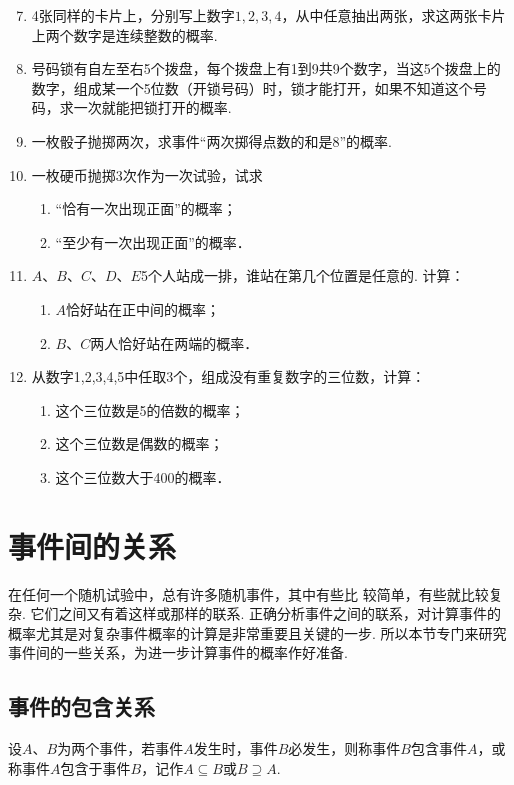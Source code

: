 \begin{enumerate}\setcounter{enumi}{6}
    \item 4张同样的卡片上，分别写上数字$1,2,3,4$，从中任意抽出两张，求这两张卡片上两个数字是连续整数的概率.
    \item 号码锁有自左至右5个拨盘，每个拨盘上有1到9共9个数字，当这5个拨盘上的数字，组成某一个5位数（开锁号码）时，锁才能打开，如果不知道这个号码，求一次就能把锁打开的概率.
    \item 一枚骰子抛掷两次，求事件“两次掷得点数的和是8”的概率.
    \item 一枚硬币抛掷3次作为一次试验，试求
\begin{enumerate}[(1)]
    \item “恰有一次出现正面”的概率；
    \item “至少有一次出现正面”的概率．
\end{enumerate}

    \item $A$、$B$、$C$、$D$、$E$5个人站成一排，谁站在第几个位置是任意的. 计算：
\begin{enumerate}[(1)]
    \item $A$恰好站在正中间的概率；
    \item $B$、$C$两人恰好站在两端的概率．
\end{enumerate}

    \item 从数字1,2,3,4,5中任取3个，组成没有重复数字的三位数，计算：
\begin{enumerate}[(1)]
\item 这个三位数是5的倍数的概率；
\item 这个三位数是偶数的概率；
\item 这个三位数大于400的概率．
\end{enumerate}

\end{enumerate}

\section{事件间的关系}

在任何一个随机试验中，总有许多随机事件，其中有些比
较简单，有些就比较复杂. 它们之间又有着这样或那样的联系. 正确分析事件之间的联系，对计算事件的概率尤其是对复杂事件概率的计算是非常重要且关键的一步. 所以本节专门来研究事件间的一些关系，为进一步计算事件的概率作好准备.

\subsection{事件的包含关系}
设$A$、$B$为两个事件，若事件$A$发生时，事件$B$必发生，则称事件$B$包含事件$A$，或称事件$A$包含于事件$B$，记作$A\subseteq B$或$B\supseteq A$.

